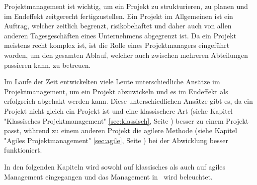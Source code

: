
Projektmanagement ist wichtig, um ein Projekt zu strukturieren, zu planen und im Endeffekt zeitgerecht fertigzustellen. Ein Projekt im Allgemeinen ist ein Auftrag, welcher zeitlich begrenzt, risikobehaftet und daher auch von allen anderen Tagesgeschäften eines Unternehmens abgegrenzt ist. Da ein Projekt meistens recht komplex ist, ist die Rolle eines Projektmanagers eingeführt worden, um den gesamten Ablauf, welcher auch zwischen mehreren Abteilungen passieren kann, zu betreuen. \cite{Projectman.}

Im Laufe der Zeit entwickelten viele Leute unterschiedliche Ansätze im Projektmanagement, um ein Projekt abzuwickeln und es im Endeffekt als erfolgreich abgehakt werden kann. Diese unterschiedlichen Ansätze gibt es, da ein Projekt nicht gleich ein Projekt ist und eine klassischere Art (siehe Kapitel "Klassisches Projektmanagement" \ref{sec:klassisch}, Seite \pageref{sec:klassisch}) besser zu einem Projekt passt, während zu einem anderen Projekt die agilere Methode (siehe Kapitel "Agiles Projektmanagement" \ref{sec:agile}, Seite \pageref{sec:agile}) bei der Abwicklung besser funktioniert. \cite{Projectman.}

In den folgenden Kapiteln wird sowohl auf klassisches als auch auf agiles Management eingegangen und das Management in \ZELIA\ wird beleuchtet. \cite{Projectman.}


